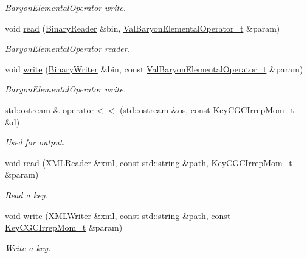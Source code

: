 \begin{DoxyCompactItemize}
\begin{DoxyCompactList}\small\item\em Baryon\+Elemental\+Operator write. \end{DoxyCompactList}\item 
void \mbox{\hyperlink{namespaceHadron_ae87d364dcd64ddf5c60a1b4d6237e633}{read}} (\mbox{\hyperlink{classADATIO_1_1BinaryReader}{Binary\+Reader}} \&bin, \mbox{\hyperlink{structHadron_1_1ValBaryonElementalOperator__t}{Val\+Baryon\+Elemental\+Operator\+\_\+t}} \&param)
\begin{DoxyCompactList}\small\item\em Baryon\+Elemental\+Operator reader. \end{DoxyCompactList}\item 
void \mbox{\hyperlink{namespaceHadron_a6ba238c6945bb5d95ae189cfee93a690}{write}} (\mbox{\hyperlink{classADATIO_1_1BinaryWriter}{Binary\+Writer}} \&bin, const \mbox{\hyperlink{structHadron_1_1ValBaryonElementalOperator__t}{Val\+Baryon\+Elemental\+Operator\+\_\+t}} \&param)
\begin{DoxyCompactList}\small\item\em Baryon\+Elemental\+Operator write. \end{DoxyCompactList}\item 
std\+::ostream \& \mbox{\hyperlink{namespaceHadron_aa163d93f390345d74a2db05417fba452}{operator$<$$<$}} (std\+::ostream \&os, const \mbox{\hyperlink{structHadron_1_1KeyCGCIrrepMom__t}{Key\+C\+G\+C\+Irrep\+Mom\+\_\+t}} \&d)
\begin{DoxyCompactList}\small\item\em Used for output. \end{DoxyCompactList}\item 
void \mbox{\hyperlink{namespaceHadron_ab8d127a4d4a1ca38aae1b0d45226789e}{read}} (\mbox{\hyperlink{classADATXML_1_1XMLReader}{X\+M\+L\+Reader}} \&xml, const std\+::string \&path, \mbox{\hyperlink{structHadron_1_1KeyCGCIrrepMom__t}{Key\+C\+G\+C\+Irrep\+Mom\+\_\+t}} \&param)
\begin{DoxyCompactList}\small\item\em Read a key. \end{DoxyCompactList}\item 
void \mbox{\hyperlink{namespaceHadron_a2454ead756c8c4f2b1f75bbf8d3c1070}{write}} (\mbox{\hyperlink{classADATXML_1_1XMLWriter}{X\+M\+L\+Writer}} \&xml, const std\+::string \&path, const \mbox{\hyperlink{structHadron_1_1KeyCGCIrrepMom__t}{Key\+C\+G\+C\+Irrep\+Mom\+\_\+t}} \&param)
\begin{DoxyCompactList}\small\item\em Write a key. \end{DoxyCompactList}\item 

\end{DoxyCompactItemize}
